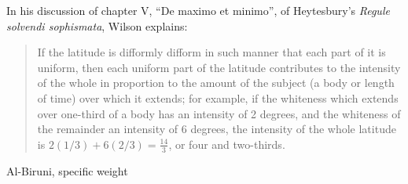 \documentclass{amsart}
\theoremstyle{definition}
\begin{document}
In his discussion of chapter V, ``De maximo et minimo'', of  Heytesbury's {\em Regule solvendi sophismata},
Wilson \cite[p.~83]{wilson} explains:

\begin{quote}
If the latitude is difformly difform in such manner that each part of it is uniform, then each uniform part of the latitude contributes to the intensity of the whole
in proportion to the amount of the subject (a body or length of time) over which it extends; for example, if the whiteness which extends over one-third of a body
has an intensity of 2 degrees, and the whiteness of the remainder an intensity of 6 degrees, the intensity of the whole latitude is $2(1/3)+6(2/3)=\frac{14}{3}$, or four
and two-thirds.
\end{quote}

Al-Biruni, specific weight



\end{document}
